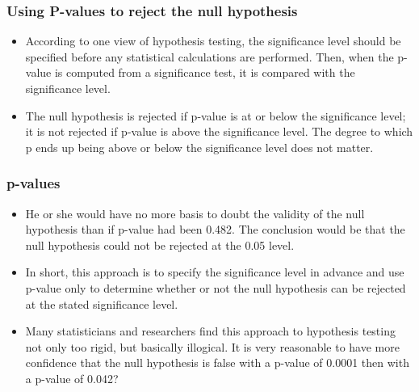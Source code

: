 ﻿\documentclass[a4]{beamer}
\begin{document}
\begin{frame}
\frametitle{Using P-values to reject the null hypothesis}
\begin{itemize}
\item According to one view of hypothesis testing, the significance level should be specified before any statistical calculations are performed. Then, when the p-value is computed from a significance test, it is compared with the significance level. 
\item The null hypothesis is rejected if p-value is at or below the significance level; it is not rejected if p-value is above the significance level. The degree to which p ends up being above or below the significance level does not matter. 
\end{itemize}
\end{frame}



\begin{frame}
\frametitle{p-values}
\begin{itemize}
\item He or she would have no more basis to doubt the validity of the null hypothesis than if p-value had been 0.482. The conclusion would be that the null hypothesis could not be rejected at the 0.05 level. \item In short, this approach is to specify the significance level in advance and use p-value only to determine whether or not the null hypothesis can be rejected at the stated significance level.
\item 
Many statisticians and researchers find this approach to hypothesis testing not only too rigid, but basically illogical. It is very reasonable to  have more confidence that the null hypothesis is false with a p-value of 0.0001 then with a p-value of 0.042? 
\end{itemize}
\end{frame}
\end{document}
